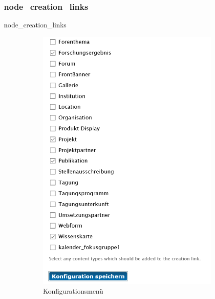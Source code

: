 \newpage
\subsubsection{node\_creation\_links}\label{subsub:nodecreationlinks}
node\_creation\_links
\begin{figure}[H]
	\centering
	\begin{subfigure}[a]{0.4\textwidth}
		\centering
		\includegraphics[height=0.20\textheight]{images/config_nodecreationlinks}
		\caption[]{Konfigurationsmenü}
		\label{fig:config_nodecreationlinks}
	\end{subfigure}
	\begin{subfigure}[A]{0.4\textwidth}
		\centering

\end{subfigure}
\end{figure}
